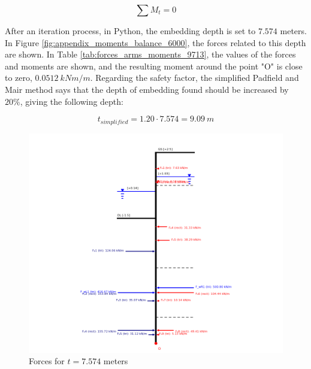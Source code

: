 \begin{equation}
    \sum{M_{t}} = 0
    \label{eq:moment}
\end{equation}

 After an iteration process, in Python, the embedding depth is set to $7.574$ meters. In Figure \ref{fig:appendix_moments_balance_6000}, the forces related to this depth are shown. In Table \ref{tab:forces_arms_moments_9713}, the values of the forces and moments are shown, and the resulting moment around the point "O" is close to zero, $0.0512 \ kNm/m$. Regarding the safety factor, the simplified Padfield and Mair method says that the depth of embedding found should be increased by $20\%$, giving the following depth:

\begin{equation}
    t_{simplified} = 1.20 \cdot 7.574 = 9.09 \ m
\end{equation}

\begin{figure}[H]
    \centering
    \includegraphics[width=0.90\linewidth]{figures/ch8/moment_balance_7574.png}
    \caption{Forces for $t = 7.574$ meters}
    \label{fig:final_moments_balance}
\end{figure}

